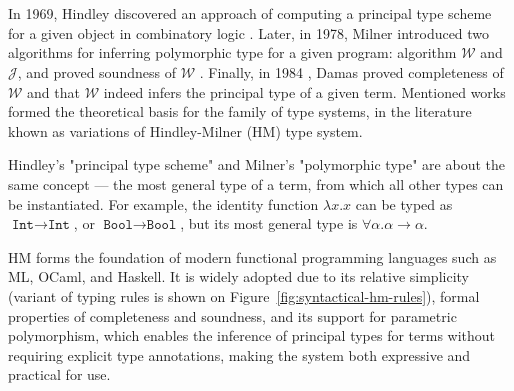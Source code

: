 \chapter{}
\label{chap:lr}



\section{}

In 1969, Hindley discovered an approach of computing a principal type scheme for a given object in combinatory logic \cite{Hindley1969_PrincipalTypeScheme}. Later, in 1978, Milner introduced two algorithms for inferring polymorphic type for a given program: algorithm $\mathcal{W}$ and $\mathcal{J}$, and proved soundness of $\mathcal{W}$ \cite{Milner1978_TypePolymorphism}. Finally, in 1984 \cite{Damas1984_TypeAssignment}, Damas proved completeness of $\mathcal{W}$ and that $\mathcal{W}$ indeed infers the principal type of a given term. Mentioned works formed the theoretical basis for the family of type systems, in the literature khown as variations of Hindley-Milner (HM) type system.

Hindley's "principal type scheme" and Milner's "polymorphic type" are about the same concept — the most general type of a term, from which all other types can be instantiated. For example, the identity function $\lambda x. x$ can be typed as $\texttt{Int} \to \texttt{Int}$, or $\texttt{Bool} \to \texttt{Bool}$, but its most general type is $\forall \alpha. \alpha \to \alpha$.

HM forms the foundation of modern functional programming languages such as ML, OCaml, and Haskell. It is widely adopted due to its relative simplicity (variant of typing rules is shown on Figure~\ref{fig:syntactical-hm-rules}), formal properties of completeness and soundness, and its support for parametric polymorphism, which enables the inference of principal types for terms without requiring explicit type annotations, making the system both expressive and practical for use.


